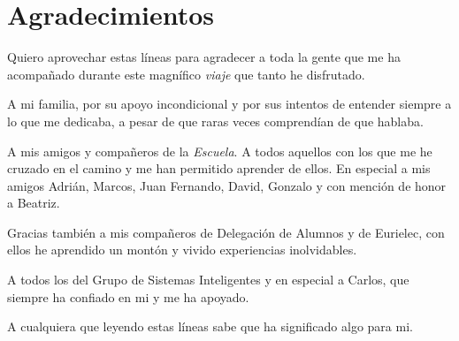 \cleardoublepage
{}
\chapter*{Agradecimientos}

Quiero aprovechar estas líneas para agradecer a toda la gente que me ha acompañado durante este magnífico \textit{viaje} que tanto he disfrutado.

A mi familia, por su apoyo incondicional y por sus intentos de entender siempre a lo que me dedicaba, a pesar de que raras veces comprendían de que hablaba.

A mis amigos y compañeros de la \textit{Escuela}. A todos aquellos con los que me he cruzado en el camino y me han permitido aprender de ellos. En especial a mis amigos Adrián, Marcos, Juan Fernando, David, Gonzalo y con mención de honor a Beatriz.

Gracias también a mis compañeros de Delegación de Alumnos y de Eurielec, con ellos he aprendido un montón y vivido experiencias inolvidables.

A todos los del Grupo de Sistemas Inteligentes y en especial a Carlos, que siempre ha confiado en mi y me ha apoyado.

A cualquiera que leyendo estas líneas sabe que ha significado algo para mi.